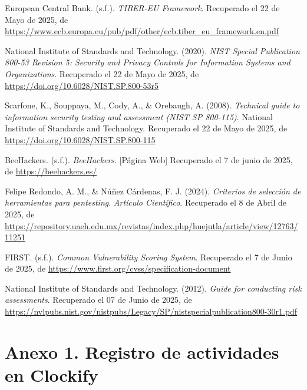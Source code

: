 \documentclass[a4paper, 11pt]{article}
\begin{document}
\begin{thebibliography}{99}
    European Central Bank. (s.f.). \textit{TIBER-EU Framework}. Recuperado el 22 de Mayo de 2025, de \url{https://www.ecb.europa.eu/pub/pdf/other/ecb.tiber_eu_framework.en.pdf}

    National Institute of Standards and Technology. (2020). \textit{NIST Special Publication 800-53 Revision 5: Security and Privacy Controls for Information Systems and Organizations}. Recuperado el 22 de Mayo de 2025, de \url{https://doi.org/10.6028/NIST.SP.800-53r5}

    Scarfone, K., Souppaya, M., Cody, A., \& Orebaugh, A. (2008). \textit{Technical guide to information security testing and assessment (NIST SP 800-115)}. National Institute of Standards and Technology. Recuperado el 22 de Mayo de 2025, de \url{https://doi.org/10.6028/NIST.SP.800-115}

    BeeHackers. (s.f.). \textit{BeeHackers}. [Página Web] Recuperado el 7 de junio de 2025, de \url{https://beehackers.es/}

    Felipe Redondo, A. M., \& Núñez Cárdenas, F. J. (2024). \textit{Criterios de selección de herramientas para pentesting}. \textit{Artículo Científico}. Recuperado el 8 de Abril de 2025, de \url{https://repository.uaeh.edu.mx/revistas/index.php/huejutla/article/view/12763/11251}

    FIRST. (s.f.). \textit{Common Vulnerability Scoring System}. Recuperado el 7 de Junio de 2025, de \url{https://www.first.org/cvss/specification-document}

    National Institute of Standards and Technology. (2012). \textit{Guide for conducting risk assessments}.  Recuperado el 07 de Junio de 2025, de \url{https://nvlpubs.nist.gov/nistpubs/Legacy/SP/nistspecialpublication800-30r1.pdf}


\end{thebibliography}


\clearpage







\thispagestyle{nohead}


\section*{Anexo 1. Registro de actividades en Clockify}
\end{document}
